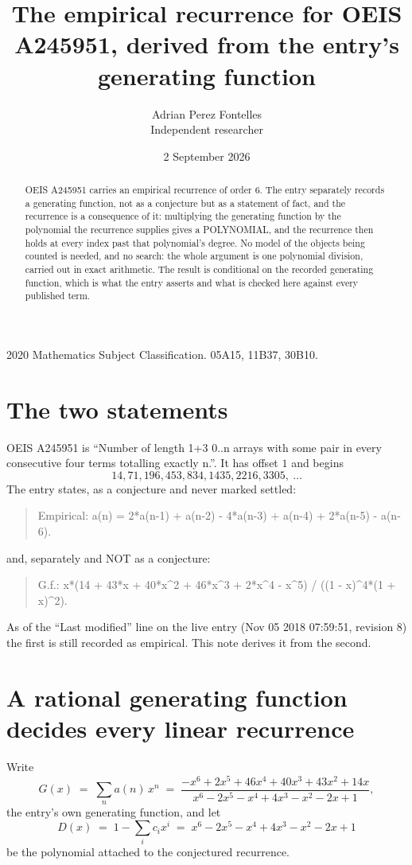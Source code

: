 \documentclass[11pt,a4paper]{article}
\title{The empirical recurrence for OEIS A245951, derived from the entry's generating function}
\author{Adrian Perez Fontelles\\ \small Independent researcher}
\date{2 September 2026}
\theoremstyle{plain}
\theoremstyle{definition}
\begin{document}
\maketitle

\begin{abstract}
OEIS A245951 carries an empirical recurrence of order $6$. The entry separately records a
generating function, not as a conjecture but as a statement of fact, and the recurrence is a
consequence of it: multiplying the generating function by the polynomial the recurrence
supplies gives a POLYNOMIAL, and the recurrence then holds at every index past that
polynomial's degree. No model of the objects being counted is needed, and no search: the
whole argument is one polynomial division, carried out in exact arithmetic. The result is
conditional on the recorded generating function, which is what the entry asserts and what is
checked here against every published term.
\end{abstract}

\noindent\small 2020 Mathematics Subject Classification. 05A15, 11B37, 30B10.\normalsize

\section{The two statements}

OEIS A245951 is ``Number of length 1+3 0..n arrays with some pair in every consecutive four terms totalling exactly n.''. It has offset $1$ and begins
\[
14, 71, 196, 453, 834, 1435, 2216, 3305,\ \dots
\]
The entry states, as a conjecture and never marked settled:
\begin{quote}
Empirical: a(n) = 2*a(n-1) + a(n-2) - 4*a(n-3) + a(n-4) + 2*a(n-5) - a(n-6).
\end{quote}
and, separately and NOT as a conjecture:
\begin{quote}
G.f.: x*(14 + 43*x + 40*x\^{}2 + 46*x\^{}3 + 2*x\^{}4 - x\^{}5) / ((1 - x)\^{}4*(1 + x)\^{}2).
\end{quote}
As of the ``Last modified'' line on the live entry (Nov 05 2018 07:59:51, revision 8) the first is still
recorded as empirical. This note derives it from the second.

\section{A rational generating function decides every linear recurrence}

Write
\[
G(x)\;=\;\sum_{n}a(n)\,x^{n}\;=\;\frac{- x^{6} + 2 x^{5} + 46 x^{4} + 40 x^{3} + 43 x^{2} + 14 x}{x^{6} - 2 x^{5} - x^{4} + 4 x^{3} - x^{2} - 2 x + 1},
\]
the entry's own generating function, and let
\[
D(x)\;=\;1-\sum_i c_i x^{i}\;=\;x^{6} - 2 x^{5} - x^{4} + 4 x^{3} - x^{2} - 2 x + 1
\]
be the polynomial attached to the conjectured recurrence.
\end{document}
